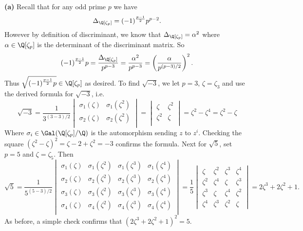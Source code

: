 \documentclass[11pt,letterpaper]{article}
\begin{document}
\begin{solution}
    \textbf{(a)} Recall that for any odd prime $p$ we have
    \[
        \Delta_{\Q[\zeta_p]} = (-1)^{\frac{p-1}{2}}p^{p-2}
    .\] 
    However by definition of discriminant, we know that $\Delta_{\Q[\zeta_p]}=\alpha^2$ where $\alpha\in \Q[\zeta_p]$ is the determinant of the discriminant matrix. So 
    \[
        (-1)^{\frac{p-1}{2}}p=\frac{\Delta_{\Q[\zeta_p]}}{p^{p-3}}=\frac{\alpha^2}{p^{p-3}}=\left(\frac{\alpha}{p^{(p-3) /2}}\right)^2
    .\]  
    Thus $\sqrt{(-1)^{\frac{p-1}{2}}p}\in \Q[\zeta_p]$ as desired. To find $\sqrt{-3}$, we let $p=3$, $\zeta=\zeta_3$ and use the derived formula for $\sqrt{-3}$, i.e.
    \[
        \sqrt{-3}=\frac{1}{3^{(3-3) /2}}\begin{vmatrix}
            \sigma_1(\zeta)&\sigma_1(\zeta^2)\\
            \sigma_2(\zeta)&\sigma_2(\zeta^2)\\
        \end{vmatrix}=\begin{vmatrix}
            \zeta&\zeta^2\\
            \zeta^2&\zeta\\
        \end{vmatrix}= \zeta^2-\zeta^4=\zeta^2-\zeta
    \]  
    Where $\sigma_i\in \Gal(\Q[\zeta_p]/\Q)$ is the automorphism sending $z$ to $z^i$. Checking the square $(\zeta^2-\zeta)^2=\zeta-2+\zeta^2=-3$ confirms the formula. Next for $\sqrt{5}$, set $p=5$ and $\zeta=\zeta_5$. Then 
    \[
        \sqrt{5}=\frac{1}{5^{(5-3) /2}}\begin{vmatrix}
            \sigma_1(\zeta)&\sigma_1(\zeta^2)&\sigma_1(\zeta^3)&\sigma_1(\zeta^4)\\
            \sigma_2(\zeta)&\sigma_2(\zeta^2)&\sigma_2(\zeta^3)&\sigma_2(\zeta^4)\\
            \sigma_3(\zeta)&\sigma_3(\zeta^2)&\sigma_3(\zeta^3)&\sigma_3(\zeta^4)\\
            \sigma_4(\zeta)&\sigma_4(\zeta^2)&\sigma_4(\zeta^3)&\sigma_4(\zeta^4)\\
        \end{vmatrix}=
        \frac{1}{5}
        \begin{vmatrix}
            \zeta&\zeta^2&\zeta^3&\zeta^4\\
            \zeta^2&\zeta^4&\zeta&\zeta^3\\
            \zeta^3&\zeta&\zeta^4&\zeta^2\\
            \zeta^4&\zeta^3&\zeta^2&\zeta
        \end{vmatrix}
        =2\zeta^3+2\zeta^2+1
    .\]
    As before, a simple check confirms that $(2\zeta^3+2\zeta^2+1)^2=5$. 
    

\end{solution}
\end{document}
